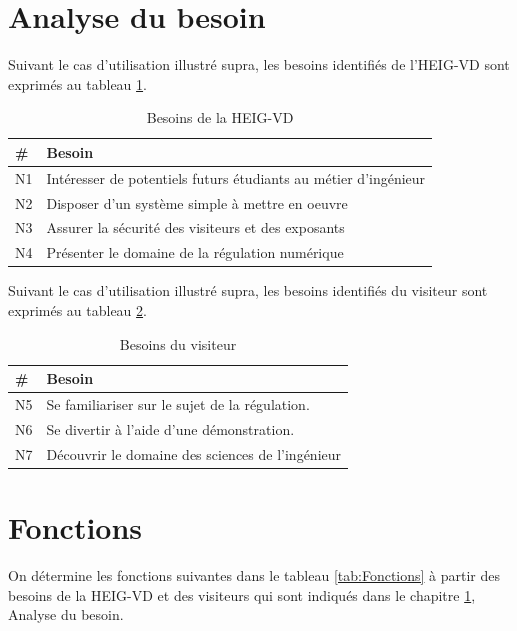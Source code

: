 \section{Analyse du besoin}\label{sec:AnalBesoins}
Suivant le cas d'utilisation illustré supra, les besoins identifiés de l'HEIG-VD sont exprimés au tableau \ref{tab:BesoinsHEIG}.

\begin{table}[H]
    \centering
    \caption{Besoins de la HEIG-VD}
    \label{tab:BesoinsHEIG}
    \begin{tabular}{|l|l|}
        \hline
        \textbf{\#} & \textbf{Besoin}                                                   \\ \hline
        N1          & Intéresser de potentiels futurs   étudiants au métier d'ingénieur \\ \hline
        N2          & Disposer d'un système simple à   mettre en oeuvre                 \\ \hline
        N3          & Assurer la sécurité des visiteurs   et des exposants              \\ \hline
        N4          & Présenter le domaine de la   régulation numérique                 \\ \hline
    \end{tabular}
\end{table}

Suivant le cas d'utilisation illustré supra, les besoins identifiés du visiteur sont exprimés au tableau \ref{tab:BesoinsVis}.

\begin{table}[H]
    \centering
    \caption{Besoins du visiteur}
    \label{tab:BesoinsVis}
    \begin{tabular}{|l|l|}
        \hline
        \textbf{\#} & \textbf{Besoin}                                    \\ \hline
        N5          & Se familiariser sur le sujet de la   régulation.   \\ \hline
        N6          & Se divertir à l'aide d'une   démonstration.        \\ \hline
        N7          & Découvrir le domaine des sciences   de l'ingénieur \\ \hline
    \end{tabular}
\end{table}

\section{Fonctions}\label{sec:Fonctions}
On détermine les fonctions suivantes dans le tableau \ref{tab:Fonctions} à partir des besoins de la HEIG-VD et des visiteurs qui sont indiqués dans le chapitre \ref{sec:AnalBesoins}, Analyse du besoin.

